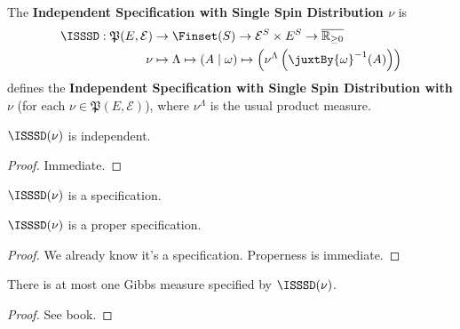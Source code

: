 \begin{definition}
    \label{def:isssd}
    \leanok

    The \textbf{Independent Specification with Single Spin Distribution $\nu$} is
    \begin{align}
        \ISSSD:\mathfrak{P}(E, \mathcal{E})&\to\Finset(S)\to\mathcal{E}^S\times E^S\to\overline{\mathbb{R}_{\geq0}}\\
        \nu&\mapsto\Lambda\mapsto(A\mid\omega)\mapsto\left(\nu^\Lambda\left(\juxtBy{\omega}^{-1}(A)\right)\right)
    \end{align}
    defines the \textbf{Independent Specification with Single Spin Distribution with $\nu$} (for each $\nu\in\mathfrak{P}(E, \mathcal{E})$), where $\nu^\Lambda$ is the usual product measure.
\end{definition}

\begin{lemma}
    \label{lem:isssd-indep}
    \leanok{}

    $\ISSSD(\nu)$ is independent.
\end{lemma}
\begin{proof}
    \leanok

  Immediate.
\end{proof}


\begin{definition}
    \label{def:isssd-spec}
    \leanok

    $\ISSSD(\nu)$ is a specification.
\end{definition}

\begin{lemma}
    \label{lem:isssd-proper-spec}
    \leanok

    $\ISSSD(\nu)$ is a proper specification.
\end{lemma}
\begin{proof}

    We already know it's a specification. Properness is immediate.
\end{proof}

\begin{lemma}
    \label{lem:isssd-gibbs-meas-uniqueness}
    \leanok

    There is at most one Gibbs measure specified by $\ISSSD(\nu)$.
\end{lemma}
\begin{proof}
    \leanok

    See book.
\end{proof}

